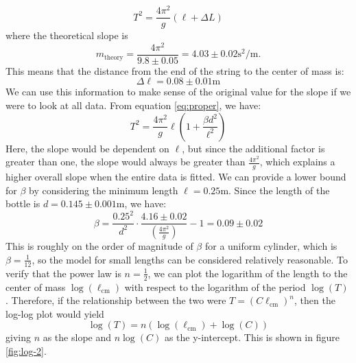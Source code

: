 \documentclass[%
 reprint,
 amsmath,amssymb
 aps,
]{revtex4-2}
\begin{document}
\begin{equation}
    T^2 = \frac{4\pi^2}{g}\left(\ell+\Delta L\right)
    \label{eq:}
\end{equation}
where the theoretical slope is
\begin{equation}
    m_\text{theory} = \frac{4\pi^2}{9.8\pm 0.05} = 4.03 \pm 0.02 \si{\second\squared\per\meter}.
    \label{eq:mtheory}
\end{equation}
This means that the distance from the end of the string to the center of mass is:
\begin{equation}
    \Delta \ell = 0.08 \pm 0.01\si{\meter} 
    \label{eq:}
\end{equation}
We can use this information to make sense of the original value for the slope if we were to look at all data. From equation \ref{eq:proper}, we have:
\begin{equation}
    T^2 = \frac{4\pi^2}{g}\ell \left(1+\frac{\beta d^2}{\ell^2}\right)
\end{equation}
Here, the slope would be dependent on $\ell$, but since the additional factor is greater than one, the slope would always be greater than $\frac{4\pi^2}{g}$, which explains a higher overall slope when the entire data is fitted. We can provide a lower bound for $\beta$ by considering the minimum length $\ell=0.25\si{\meter}$. Since the length of the bottle is $d=0.145 \pm 0.001 \si{\meter}$, we have:
\begin{equation}
    \beta = \frac{0.25^2}{d^2} \cdot \frac{4.16 \pm 0.02}{\left(\frac{4\pi^2}{g}\right)}-1 = 0.09 \pm 0.02
    \label{eq:}
\end{equation}
This is roughly on the order of magnitude of $\beta$ for a uniform cylinder, which is $\beta=\frac{1}{12}$, so the model for small lengths can be considered relatively reasonable. To verify that the power law is $n=\frac{1}{2}$, we can plot the logarithm of the length to the center of mass $\log(\ell_\text{cm})$ with respect to the logarithm of the period $\log(T)$. Therefore, if the relationship between the two were $T = (C\ell_\text{cm})^n$, then the log-log plot would yield
\begin{equation}
    \log(T) = n\left(\log(\ell_\text{cm}) + \log(C)\right)
    \label{eq:}
\end{equation}
giving $n$ as the slope and $n\log(C)$ as the y-intercept. This is shown in figure \ref{fig:log-2}.
\end{document}
